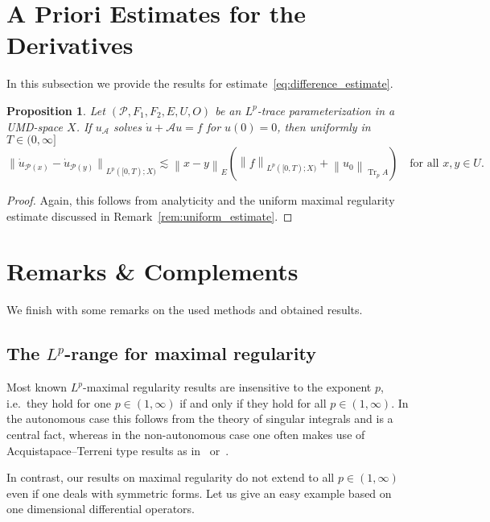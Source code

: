 \documentclass[reqno,a4paper,final]{amsart}
\numberwithin{equation}{section}
\newtheorem{proposition}[lemma]{Proposition}
\theoremstyle{definition}
\begin{document}
\section{A Priori Estimates for the Derivatives}

	In this subsection we provide the results for estimate~\eqref{eq:difference_estimate}.		
	
	\begin{proposition}\label{prop:l2}
		Let $(\mathcal{P}, F_1 , F_2, E, U, O)$ be an $L^p$-trace parameterization in a UMD-space $X$. If $u_{\mathcal{A}}$ solves $\dot{u} + \mathcal{A}u = f$ for $u(0) = 0$, then uniformly in $T \in (0,\infty]$
			\begin{equation*}
				{\lVert{\dot{u}_{\mathcal{P}(x)} - \dot{u}_{\mathcal{P}(y)}}\rVert}_{L^p([0,T);X)} \lesssim {\left\lVert{x-y}\right\rVert}_E ({\left\lVert{f}\right\rVert}_{L^p([0,T);X)} + {\left\lVert{u_0}\right\rVert}_{\operatorname{Tr}_p A}) \quad \text{for all } x,y \in U.
			\end{equation*}
	\end{proposition}
	\begin{proof}
		Again, this follows from analyticity and the uniform maximal regularity estimate discussed in Remark~\ref{rem:uniform_estimate}.
	\end{proof}
	
\section{Remarks \& Complements}

	We finish with some remarks on the used methods and obtained results. 
	
	\subsection{The \texorpdfstring{$L^p$}{p}-range for maximal regularity}
	
	Most known $L^p$-maximal regularity results are insensitive to the exponent $p$, i.e.\ they hold for one $p \in (1, \infty)$ if and only if they hold for all $p \in (1, \infty)$. In the autonomous case this follows from the theory of singular integrals and is a central fact, whereas in the non-autonomous case one often makes use of Acquistapace--Terreni type results as in~\cite{HaaOuh15} or~\cite{AreMon14}.
	
	In contrast, our results on maximal regularity do not extend to all $p \in (1, \infty)$ even if one deals with symmetric forms. Let us give an easy example based on one dimensional differential operators.
	
\end{document}

